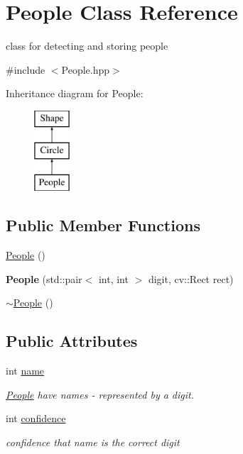 \hypertarget{class_people}{}\section{People Class Reference}
\label{class_people}


class for detecting and storing people  




{\ttfamily \#include $<$People.\+hpp$>$}

Inheritance diagram for People\+:\begin{figure}[H]
\begin{center}
\leavevmode
\includegraphics[height=3.000000cm]{class_people}
\end{center}
\end{figure}
\subsection*{Public Member Functions}
\begin{DoxyCompactItemize}
\item 
\mbox{\hyperlink{class_people_aae1408eddfd15a5007003ecdf1507941}{People}} ()
\item 
\mbox{\label{class_people_abfabd2f2e27a7aa269d404e8f27f903e}} 
{\bfseries People} (std\+::pair$<$ int, int $>$ digit, cv\+::\+Rect rect)
\item 
\mbox{\hyperlink{class_people_adae124857f64dadff4e1801410b3dab2}{$\sim$\+People}} ()
\end{DoxyCompactItemize}
\subsection*{Public Attributes}
\begin{DoxyCompactItemize}
\item 
\mbox{\label{class_people_a06e995c8c3b9808db931bedb44d782c8}} 
int \mbox{\hyperlink{class_people_a06e995c8c3b9808db931bedb44d782c8}{name}}
\begin{DoxyCompactList}\small\item\em \mbox{\hyperlink{class_people}{People}} have names -\/ represented by a digit. \end{DoxyCompactList}\item 
\mbox{\label{class_people_a44d79c52132068763c91e308e9685e06}} 
int \mbox{\hyperlink{class_people_a44d79c52132068763c91e308e9685e06}{confidence}}
\begin{DoxyCompactList}\small\item\em confidence that name is the correct digit \end{DoxyCompactList}\end{DoxyCompactItemize}


